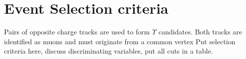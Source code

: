 % 

\section{Event Selection criteria}
\label{sec:evtselection}


Pairs of opposite charge tracks are used to form $\Upsilon$ candidates. Both tracks are identified as muons and must originate from a common vertex
Put selection criteria here, discuss discriminating variables, put all cuts in a table. 